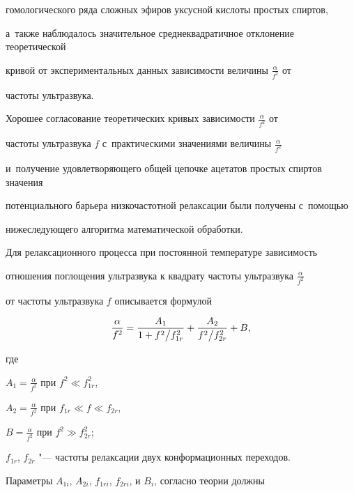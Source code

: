 гомологического ряда сложных эфиров уксусной кислоты простых спиртов, 

а~также наблюдалось значительное среднеквадратичное отклонение теоретической 

кривой от экспериментальных данных зависимости величины $\frac\alpha {f^2}$ от 

частоты ультразвука.



Хорошее согласование теоретических кривых зависимости $\frac\alpha {f^2}$ от 

частоты ультразвука $f$ с~практическими значениями величины $\frac\alpha {f^2}$ 

и~получение удовлетворяющего общей цепочке ацетатов простых спиртов значения 

потенциального барьера низкочастотной релаксации были получены с~помощью 

нижеследующего алгоритма математической обработки.



Для релаксационного процесса при постоянной температуре зависимость 

отношения поглощения ультразвука к квадрату частоты ультразвука $\frac\alpha {f^2}$ 

от частоты ультразвука $f$ описывается формулой

\begin{equation}

\frac{\alpha }{f^2}=\frac{A_1 }{1+{f^2} 

\mathord{\left/ {\vphantom {{f^2} {f_{1r}^2 }}} \right. 

\kern-\nulldelimiterspace} {f_{1r}^2 }}+\frac{A_2 }{{f^2} 

\mathord{\left/ {\vphantom {{f^2} {f_{2r}^2 }}} \right. 

\kern-\nulldelimiterspace} {f_{2r}^2 }}+B,

\end{equation}

где 

$A_1 =\frac\alpha {f^2}$ при $f^2\ll f_{1r}^2 $, 

$A_2 =\frac\alpha {f^2}$ при $f_{1r} \ll f\ll f_{2r} $, 

$B= \frac\alpha {f^2}$ при $f^2\gg f_{2r}^2 $; 

$f_{1r}$, $f_{2r}$ "--- частоты релаксации двух конформационных переходов.



Параметры $A_{1i}$, $A_{2i}$, $f_{1ri}$, $f_{2ri}$, и $B_{i}$, согласно теории должны 

